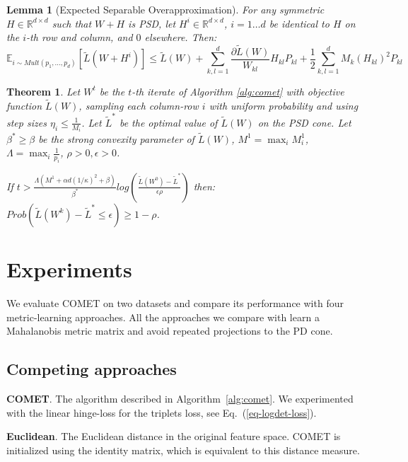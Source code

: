 \documentclass{article} %
\newcommand\mat[1]{{#1}}
\newcommand{\W}{\mat{W}}
\newcommand{\Hh}{\mat{H}}
\newcommand{\Pp}{\mat{P}}
\newcommand{\R}{\mathbb{R}}
\newcommand{\tL}{\tilde{L}(\W)}
\newcommand{\grdkl}{\frac{\partial \tL}{\W_{kl}}}
\newtheorem{theorem}{Theorem}
\newtheorem{lemma}{Lemma}
\renewcommand{\eqref}[1]{Eq.~(\ref{#1})}
\begin{document}
\begin{lemma}[Expected Separable Overapproximation]\label{lem:ESO}
For any symmetric $\Hh \in \R^{d \times d}$ such that $\W + \Hh$ is PSD, let $\Hh^i \in \R^{d \times d}$, $i=1 \ldots d$ be identical to $\Hh$ on the $i$-th row and column, and $0$ elsewhere. Then:
\begin{equation}
\mathbb{E}_{i \sim Mult(p_1, \ldots, p_d)} \left[ \tilde{L}(\W + \Hh^i) \right] \leq 
\tL + \sum_{k,l=1}^d  \grdkl \Hh_{kl} \Pp_{kl} + \frac{1}{2} \sum_{k,l=1}^d   M_k (\Hh_{kl})^2 \Pp_{kl}
\end{equation}

\end{lemma}



\begin{theorem}
Let $\W^t$ be the $t$-th iterate of Algorithm \ref{alg:comet} with objective function $\tL$, sampling each column-row $i$ with uniform probability and using step sizes $\eta_i \leq \frac{1}{M_i}$. Let $\tilde{L}^*$ be the optimal value of $\tL$ on the PSD cone. Let $\beta^* \geq \beta$ be the strong convexity parameter of $\tL$, $M^1 = \max_i M^1_i$, $\Lambda = \max_i \frac{1}{p_i}$, $\rho >0, \epsilon>0$.

If $t > \frac{\Lambda (M^1 + \alpha d (1/\kappa)^2 + \beta)}{\beta^*} log \left( \frac{\tilde{L}(W^0) - \tilde{L}^*}{\epsilon \rho}\right)$ then: $Prob(\tilde{L}(\W^k) - \tilde{L}^* \leq \epsilon) \geq 1-\rho$.
\end{theorem}


\section{Experiments}
We evaluate COMET on two datasets and compare its performance with four metric-learning approaches. All the approaches we compare with learn a Mahalanobis metric matrix and avoid repeated projections to the PD cone. 


\subsection{Competing approaches}

\textbf{COMET}. The algorithm described in Algorithm~\ref{alg:comet}. We experimented with the linear hinge-loss for the triplets loss, see \eqref{eq-logdet-loss}.

\textbf{Euclidean}. The Euclidean distance in the original feature space. COMET is initialized using the identity matrix, which is equivalent to this distance measure.
\end{document}
